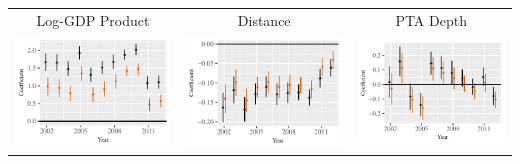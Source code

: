 \documentclass[landscape,a0paper,fontscale=0.285]{baposter} %
\begin{document}
\begin{poster}
{\centering
\begin{tabular}{c@{\hskip -.1cm}c@{\hskip -.1cm}c@{\hskip -.1cm}}
Log-GDP Product & Distance  & PTA Depth  \\
\includegraphics[height=.14\textheight, clip=true, trim=.5cm .4cm 0cm .1cm]{figures/rl_plots/mass.pdf}    &
\includegraphics[height=.14\textheight, clip=true, trim=.5cm .4cm 0cm .1cm]{figures/rl_plots/distance.pdf}   &
\includegraphics[height=.14\textheight, clip=true, trim=.5cm .4cm 0cm .1cm]{figures/rl_plots/PTADepth.pdf}\\



\end{tabular}}
\end{poster}
\end{document}
